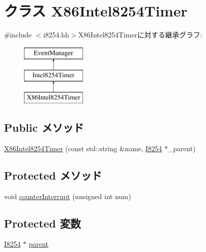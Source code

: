\hypertarget{classX86ISA_1_1I8254_1_1X86Intel8254Timer}{
\section{クラス X86Intel8254Timer}
\label{classX86ISA_1_1I8254_1_1X86Intel8254Timer}
}


{\ttfamily \#include $<$i8254.hh$>$}X86Intel8254Timerに対する継承グラフ:\begin{figure}[H]
\begin{center}
\leavevmode
\includegraphics[height=3cm]{classX86ISA_1_1I8254_1_1X86Intel8254Timer}
\end{center}
\end{figure}
\subsection*{Public メソッド}
\begin{DoxyCompactItemize}
\item 
\hyperlink{classX86ISA_1_1I8254_1_1X86Intel8254Timer_a2bfac47dd2fed9916a7acf89da01dcfc}{X86Intel8254Timer} (const std::string \&name, \hyperlink{classX86ISA_1_1I8254}{I8254} $\ast$\_\-parent)
\end{DoxyCompactItemize}
\subsection*{Protected メソッド}
\begin{DoxyCompactItemize}
\item 
void \hyperlink{classX86ISA_1_1I8254_1_1X86Intel8254Timer_abe266c027cb8a03b2e1e2f08d9398679}{counterInterrupt} (unsigned int num)
\end{DoxyCompactItemize}
\subsection*{Protected 変数}
\begin{DoxyCompactItemize}
\item 
\hyperlink{classX86ISA_1_1I8254}{I8254} $\ast$ \hyperlink{classX86ISA_1_1I8254_1_1X86Intel8254Timer_a44e5f44b01ebd07b6e85412307f3f3b6}{parent}
\end{DoxyCompactItemize}


